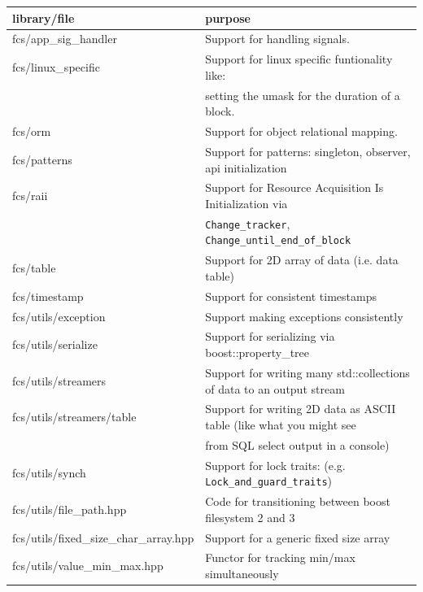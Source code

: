 \documentclass[11pt]{article}
\begin{document}
\begin{center}
\begin{tabular}{ll}
 library/file                                  &  purpose                                                                \\
\hline
 fcs/app\_{}sig\_{}handler                     &  Support for handling signals.                                          \\
 fcs/linux\_{}specific                         &  Support for linux specific funtionality like:                          \\
                                               &  setting the umask for the duration of a block.                         \\
 fcs/orm                                       &  Support for object relational mapping.                                 \\
 fcs/patterns                                  &  Support for patterns: singleton, observer, api initialization          \\
 fcs/raii                                      &  Support for Resource Acquisition Is Initialization via                 \\
                                               &  \texttt{Change\_tracker}, \texttt{Change\_until\_end\_of\_block}       \\
 fcs/table                                     &  Support for 2D array of data (i.e. data table)                         \\
 fcs/timestamp                                 &  Support for consistent timestamps                                      \\
 fcs/utils/exception                           &  Support making exceptions consistently                                 \\
 fcs/utils/serialize                           &  Support for serializing via boost::property\_{}tree                    \\
 fcs/utils/streamers                           &  Support for writing many std::collections of data to an output stream  \\
 fcs/utils/streamers/table                     &  Support for writing 2D data as ASCII table (like what you might see    \\
                                               &  from SQL select output in a console)                                   \\
 fcs/utils/synch                               &  Support for lock traits: (e.g. \texttt{Lock\_and\_guard\_traits})      \\
 fcs/utils/file\_{}path.hpp                    &  Code for transitioning between boost filesystem 2 and 3                \\
 fcs/utils/fixed\_{}size\_{}char\_{}array.hpp  &  Support for a generic fixed size array                                 \\
 fcs/utils/value\_{}min\_{}max.hpp             &  Functor for tracking min/max simultaneously                            \\
\end{tabular}
\end{center}
\end{document}
